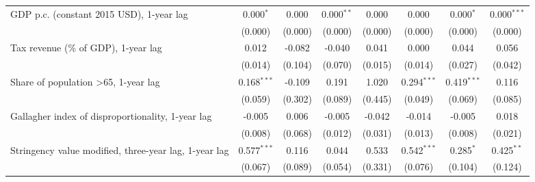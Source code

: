 \begin{table}[htbp]
\begin{tabular}{lccccccc}
      GDP p.c. (constant 2015 USD), 1-year lag                                                  & 0.000$^{*}$   & 0.000                     & 0.000$^{**}$   & 0.000            & 0.000           & 0.000$^{*}$     & 0.000$^{***}$\\   
                                                                                                & (0.000)       & (0.000)                   & (0.000)        & (0.000)          & (0.000)         & (0.000)         & (0.000)\\   
      Tax revenue (\% of GDP), 1-year lag                                                       & 0.012         & -0.082                    & -0.040         & 0.041            & 0.000           & 0.044           & 0.056\\   
                                                                                                & (0.014)       & (0.104)                   & (0.070)        & (0.015)          & (0.014)         & (0.027)         & (0.042)\\   
      Share of population >65, 1-year lag                                                       & 0.168$^{***}$ & -0.109                    & 0.191          & 1.020            & 0.294$^{***}$   & 0.419$^{***}$   & 0.116\\   
                                                                                                & (0.059)       & (0.302)                   & (0.089)        & (0.445)          & (0.049)         & (0.069)         & (0.085)\\   
      Gallagher index of disproportionality, 1-year lag                                         & -0.005        & 0.006                     & -0.005         & -0.042           & -0.014          & -0.005          & 0.018\\   
                                                                                                & (0.008)       & (0.068)                   & (0.012)        & (0.031)          & (0.013)         & (0.008)         & (0.021)\\   
      Stringency value modified, three-year lag, 1-year lag                                     & 0.577$^{***}$ & 0.116                     & 0.044          & 0.533            & 0.542$^{***}$   & 0.285$^{*}$     & 0.425$^{**}$\\   
                                                                                                & (0.067)       & (0.089)                   & (0.054)        & (0.331)          & (0.076)         & (0.104)         & (0.124)\\   

\end{tabular}
\end{table}

